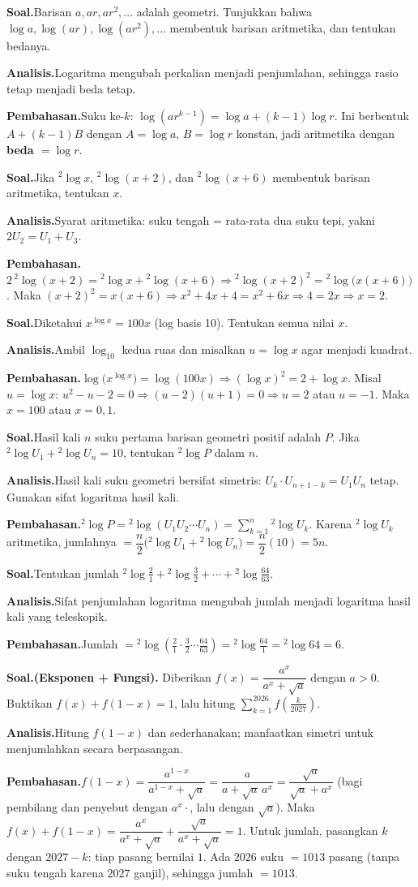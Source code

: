 \documentclass[11pt,a4paper]{report}
\theoremstyle{gaya}
\newcommand{\knomor}[1]{\par\medskip\noindent{\bfseries\color{ungu}#1}\par\nopagebreak}
\newcommand{\ksoal}{\noindent\textbf{\color{biru}Soal.}\space}
\newcommand{\kanalisis}{\par\noindent\textbf{\color{oranye}Analisis.}\space}
\newcommand{\kbahas}{\par\noindent\textbf{\color{hijau}Pembahasan.}\space}
\newcommand{\kbagian}[1]{\par\medskip\noindent{\large\bfseries\color{biru}#1}\par\smallskip}
\begin{document}
\kbagian{Bagian C}

\knomor{C.1}
\ksoal Barisan $a, ar, ar^2, \dots$ adalah geometri. Tunjukkan bahwa $\log a, \log(ar), \log(ar^2),\dots$ membentuk barisan aritmetika, dan tentukan bedanya.
\kanalisis Logaritma mengubah perkalian menjadi penjumlahan, sehingga rasio tetap menjadi beda tetap.
\kbahas Suku ke-$k$: $\log(ar^{k-1})=\log a+(k-1)\log r$. Ini berbentuk $A+(k-1)B$ dengan $A=\log a$, $B=\log r$ konstan, jadi aritmetika dengan \textbf{beda $=\log r$}.

\knomor{C.2}
\ksoal Jika ${}^{2}\!\log x$, ${}^{2}\!\log(x+2)$, dan ${}^{2}\!\log(x+6)$ membentuk barisan aritmetika, tentukan $x$.
\kanalisis Syarat aritmetika: suku tengah = rata-rata dua suku tepi, yakni $2U_2=U_1+U_3$.
\kbahas $2\,{}^{2}\!\log(x+2)={}^{2}\!\log x+{}^{2}\!\log(x+6)\Rightarrow {}^{2}\!\log(x+2)^2={}^{2}\!\log\big(x(x+6)\big)$. Maka $(x+2)^2=x(x+6)\Rightarrow x^2+4x+4=x^2+6x\Rightarrow 4=2x\Rightarrow x=2.$

\knomor{C.3}
\ksoal Diketahui $x^{\log x}=100x$ (log basis 10). Tentukan semua nilai $x$.
\kanalisis Ambil $\log_{10}$ kedua ruas dan misalkan $u=\log x$ agar menjadi kuadrat.
\kbahas $\log\big(x^{\log x}\big)=\log(100x)\Rightarrow (\log x)^2=2+\log x$. Misal $u=\log x$: $u^2-u-2=0\Rightarrow(u-2)(u+1)=0\Rightarrow u=2$ atau $u=-1$. Maka $x=100$ atau $x=0{,}1$.

\knomor{C.4}
\ksoal Hasil kali $n$ suku pertama barisan geometri positif adalah $P$. Jika ${}^{2}\!\log U_1 + {}^{2}\!\log U_n = 10$, tentukan ${}^{2}\!\log P$ dalam $n$.
\kanalisis Hasil kali suku geometri bersifat simetris: $U_k\cdot U_{n+1-k}=U_1 U_n$ tetap. Gunakan sifat logaritma hasil kali.
\kbahas ${}^{2}\!\log P={}^{2}\!\log(U_1U_2\cdots U_n)=\sum_{k=1}^{n}{}^{2}\!\log U_k$. Karena ${}^{2}\!\log U_k$ aritmetika, jumlahnya $=\dfrac n2\big({}^{2}\!\log U_1+{}^{2}\!\log U_n\big)=\dfrac n2(10)=5n.$

\knomor{C.5}
\ksoal Tentukan jumlah ${}^{2}\!\log\tfrac{2}{1}+{}^{2}\!\log\tfrac{3}{2}+\cdots+{}^{2}\!\log\tfrac{64}{63}$.
\kanalisis Sifat penjumlahan logaritma mengubah jumlah menjadi logaritma hasil kali yang teleskopik.
\kbahas Jumlah $={}^{2}\!\log\left(\tfrac21\cdot\tfrac32\cdots\tfrac{64}{63}\right)={}^{2}\!\log\tfrac{64}{1}={}^{2}\!\log 64=6.$

\kbagian{Bagian D}

\knomor{D.1}
\ksoal \textbf{(Eksponen + Fungsi).} Diberikan $f(x)=\dfrac{a^x}{a^x+\sqrt a}$ dengan $a>0$. Buktikan $f(x)+f(1-x)=1$, lalu hitung $\sum_{k=1}^{2026} f\!\left(\tfrac{k}{2027}\right)$.
\kanalisis Hitung $f(1-x)$ dan sederhanakan; manfaatkan simetri untuk menjumlahkan secara berpasangan.
\kbahas $f(1-x)=\dfrac{a^{1-x}}{a^{1-x}+\sqrt a}=\dfrac{a}{a+\sqrt a\,a^{x}}=\dfrac{\sqrt a}{\sqrt a+a^{x}}$ (bagi pembilang dan penyebut dengan $a^{x}\cdot$, lalu dengan $\sqrt a$). Maka $f(x)+f(1-x)=\dfrac{a^x}{a^x+\sqrt a}+\dfrac{\sqrt a}{a^x+\sqrt a}=1.$ Untuk jumlah, pasangkan $k$ dengan $2027-k$: tiap pasang bernilai $1$. Ada $2026$ suku $=1013$ pasang (tanpa suku tengah karena $2027$ ganjil), sehingga jumlah $=1013.$
\end{document}
